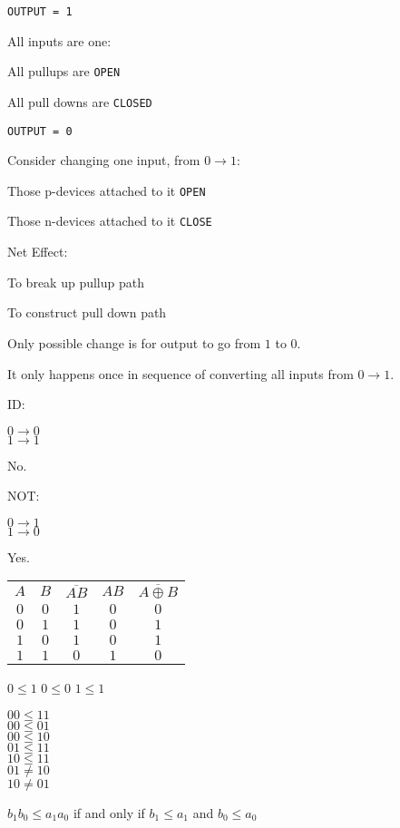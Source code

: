 \documentclass[a4paper,12pt]{article}
\begin{document}
\verb!OUTPUT = 1!

All inputs are one:

All pullups are \verb!OPEN!

All pull downs are \verb!CLOSED!

\verb!OUTPUT = 0!

Consider changing one input, from $0 \to 1$:

Those p-devices attached to it \verb!OPEN!

Those n-devices attached to it \verb!CLOSE!

Net Effect:

To break up pullup path

To construct pull down path

Only possible change is for output to go from $1$ to $0$.

It only happens once in sequence of converting all inputs from $0 \to
1$.

ID:

$0 \to 0$ \\
$1 \to 1$

No.

NOT:

$0 \to 1$\\
$1 \to 0$

Yes.

\begin{tabular}{ccccc}
$A$	&	$B$	&	$\overline{AB}$	&	$AB$	&	$\overline{A \oplus B}$	\\
$0$	&	$0$	&	$1$					&	$0$	&	$0$						\\
$0$	&	$1$	&	$1$					&	$0$	&	$1$						\\
$1$	&	$0$	&	$1$					&	$0$	&	$1$						\\
$1$	&	$1$	&	$0$					&	$1$	&	$0$						\\
\end{tabular}

$0 \leq 1$ \hspace{20mm} $0 \leq 0$ \hspace{20mm} $1 \leq 1$

$00 \leq 11$ \\
$00 \leq 01$ \\
$00 \leq 10$ \\
$01 \leq 11$ \\
$10 \leq 11$ \\
$01 \not= 10$ \\
$10 \not= 01$

$b_{1} b_{0} \leq a_{1} a_{0}$ if and only if $b_{1} \leq a_{1}$ and
$b_{0} \leq a_{0}$
\end{document}
